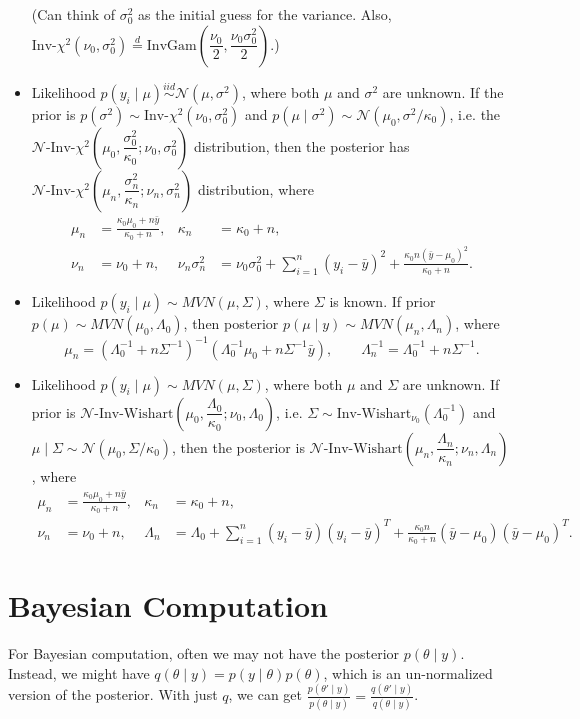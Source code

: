 \documentclass[twoside]{article}
\newcommand{\dis}{\displaystyle}
\newcommand\calN{\mathcal{N}}
\newcommand\Lmb{\Lambda}
\newcommand\sg{\sigma}
\newcommand\Sg{\Sigma}
\def\t{\theta}
\begin{document}
\begin{itemize}
(Can think of $\sg_0^2$ as the initial guess for the variance. Also, $\text{Inv-}\chi^2(\nu_0, \sg_0^2) \stackrel{d}{=} \text{InvGam}\left( \dfrac{\nu_0}{2}, \dfrac{\nu_0 \sg_0^2}{2} \right)$.)

\item Likelihood $p(y_i \mid \mu) \stackrel{iid}{\sim} \calN(\mu, \sg^2)$, where both $\mu$ and $\sg^2$ are unknown. If the prior is $p(\sg^2) \sim \text{Inv-}\chi^2(\nu_0, \sg_0^2)$ and $p(\mu \mid \sg^2) \sim \calN(\mu_0, \sg^2 / \kappa_0)$, i.e. the $\calN\text{-Inv-}\chi^2 \left(\mu_0, \dfrac{\sg_0^2}{\kappa_0}; \nu_0, \sg_0^2 \right)$ distribution, then the posterior has $\calN\text{-Inv-}\chi^2 \left(\mu_n, \dfrac{\sg_n^2}{\kappa_n}; \nu_n, \sg_n^2 \right)$ distribution, where
\begin{align*} \mu_n &= \frac{\kappa_0 \mu_0 + n \bar{y}}{\kappa_0 + n}, &\kappa_n &= \kappa_0 + n, \\ 
\nu_n &= \nu_0 + n, &\nu_n \sg_n^2 &= \nu_0 \sg_0^2 + \sum_{i=1}^n (y_i - \bar{y})^2 + \frac{\kappa_0 n(\bar{y} - \mu_0)^2}{\kappa_0 + n}. \end{align*}

\item Likelihood $p(y_i \mid \mu) \sim MVN(\mu, \Sg)$, where $\Sg$ is known. If prior $p(\mu) \sim MVN(\mu_0, \Lmb_0)$, then posterior $p(\mu \mid y) \sim MVN(\mu_n, \Lmb_n)$, where
\[ \mu_n = (\Lmb_0^{-1} + n\Sg^{-1})^{-1}(\Lmb_0^{-1}\mu_0 + n\Sg^{-1}\bar{y}), \qquad \Lmb_n^{-1} = \Lmb_0^{-1} + n\Sg^{-1}. \]

\item Likelihood $p(y_i \mid \mu) \sim MVN(\mu, \Sg)$, where both $\mu$ and $\Sg$ are unknown. If prior is $\calN\text{-Inv-Wishart}\left(\mu_0, \dfrac{\Lmb_0}{\kappa_0}; \nu_0, \Lmb_0 \right)$, i.e. $\Sg \sim \text{Inv-Wishart}_{\nu_0}(\Lmb_0^{-1})$ and $\mu \mid \Sg \sim \calN(\mu_0, \Sg/\kappa_0)$, then the posterior is $\calN\text{-Inv-Wishart}\left(\mu_n, \dfrac{\Lmb_n}{\kappa_n}; \nu_n, \Lmb_n \right)$, where
\begin{align*} \mu_n &= \frac{\kappa_0 \mu_0 + n \bar{y}}{\kappa_0 + n}, &\kappa_n &= \kappa_0 + n, \\ 
\nu_n &= \nu_0 + n, &\Lmb_n &= \Lmb_0 + \sum_{i=1}^n (y_i - \bar{y})(y_i - \bar{y})^T + \frac{\kappa_0 n}{\kappa_0 + n}(\bar{y} - \mu_0)(\bar{y} - \mu_0)^T. \end{align*}

\end{itemize}

\section{Bayesian Computation}
For Bayesian computation, often we may not have the posterior $p(\t \mid y)$. Instead, we might have $q(\t \mid y) = p(y \mid \t) p(\t)$, which is an un-normalized version of the posterior. With just $q$, we can get $\dis\frac{p(\t' \mid y)}{p(\t \mid y)} = \dis\frac{q(\t' \mid y)}{q(\t \mid y)}$.
\end{document}
